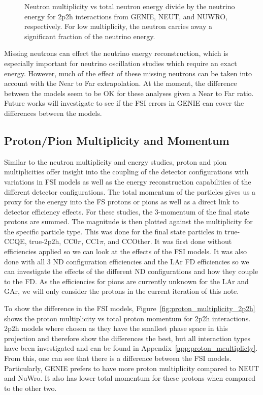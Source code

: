 \documentclass[12pt]{article}
\begin{document}
\begin{figure}
\begin{subfigure}[b]{0.32\textwidth}
\end{subfigure}
\caption{Neutron multiplicity vs total neutron energy divide by the neutrino energy for 2p2h interactions from GENIE, NEUT, and NUWRO, respectively.  For low multiplicity, the neutron carries away a significant fraction of the neutrino energy.} 
\label{fig:Neutron_multi_ene_enu_2p2h_ND}
\end{figure}
\FloatBarrier

Missing neutrons can effect the neutrino energy reconstruction, which is especially important for neutrino oscillation studies which require an exact energy.
However, much of the effect of these missing neutrons can be taken into account with the Near to Far extrapolation.
At the moment, the difference between the models seem to be OK for these analyses given a Near to Far ratio.
Future works will investigate to see if the FSI errors in GENIE can cover the differences between the models. 
 

\subsection{Proton/Pion Multiplicity and Momentum}
\label{subsec:Particle_multiplicities_momentum}

Similar to the neutron multiplicity and energy studies, proton and pion multiplicities offer insight into the coupling of the detector configurations with variations in FSI models as well as the energy reconstruction capabilities of the different detector configurations. 
The total momentum of the particles gives us a proxy for the energy into the FS protons or pions as well as a direct link to detector efficiency effects.  
For these studies, the 3-momentum of the final state protons are summed. 
The magnitude is then plotted against the multiplicity for the specific particle type. 
This was done for the final state particles in true-CCQE, true-2p2h, CC0$\pi$, CC1$\pi$, and CCOther. It was first done without efficiencies applied so we can look at the effects of the FSI models. It was also done with all 3 ND configuration efficiencies and the LAr FD efficiencies so we can investigate the effects of the different ND configurations and how they couple to the FD.
As the efficiencies for pions are currently unknown for the LAr and GAr, we will only consider the protons in the current iteration of this note. 

To show the difference in the FSI models, Figure~\ref{fig:proton_multiplicity_2p2h} shows the proton multiplicity vs total proton momentum for 2p2h interactions. 
2p2h models where chosen as they have the smallest phase space in this projection and therefore show the differences the best, but all interaction types have been investigated and can be found in Appendix~\ref{app:proton_meultiplicty}.
From this, one can see that there is a difference between the FSI models.  
Particularly, GENIE prefers to have more proton multiplicity compared to NEUT and NuWro.
It also has lower total momentum for these protons when compared to the other two.
 
\end{document}
